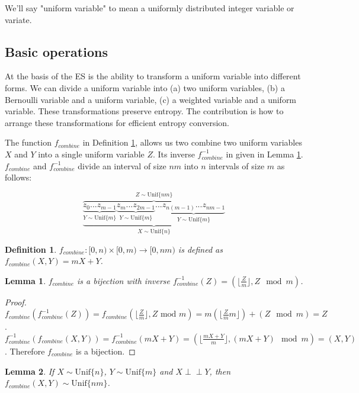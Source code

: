 \documentclass[12pt]{article}
\newtheorem{lemma}{Lemma}
\newtheorem{definition}{Definition}
\newcommand{\indep}{\perp\!\!\!\perp}
\newcommand{\unif}[1]{\mathrm{Unif}\{#1\}}
\begin{document}
We'll say "uniform variable" to mean a uniformly distributed integer variable or variate.


\subsection{Basic operations}

At the basis of the ES is the ability to transform a uniform variable into different forms.  We can divide a uniform variable into (a) two uniform variables, (b) a Bernoulli variable and a uniform variable, (c) a weighted variable and a uniform variable. These transformations preserve entropy. The contribution is how to arrange these transformations for efficient entropy conversion.

The function $f_{combine}$ in Definition \ref{def:combine}, allows us two combine two uniform variables $X$ and $Y$ into a single uniform variable $Z$. Its inverse $f^{-1}_{combine}$ in given in Lemma \ref{lem:divide}. $f_{combine}$ and $f^{-1}_{combine}$ divide an interval of size $nm$ into $n$ intervals of size $m$ as follows:

\[
\overbrace{    
    \underbrace{
        \underbrace{z_0 ... z_{m-1}}_{Y \sim \unif{m}}
        \underbrace{z_m ... z_{2m-1}}_{Y \sim \unif{m}}
        ...
        \underbrace{z_{n(m-1)}...z_{nm-1}}_{Y \sim \unif{m}}    
    }}_{X \sim \unif{n}}
^{Z \sim \unif{nm}}
\]

\begin{definition}
    $f_{combine}: [0,n)\times [0,m) \rightarrow [0,nm)$ is defined as $f_{combine}(X,Y) = mX+Y$.
    \label{def:combine}
\end{definition}

\begin{lemma}
    $f_{combine}$ is a bijection with inverse $f^{-1}_{combine}(Z) = (\lfloor \frac{Z}{m} \rfloor, Z \mod m)$.
    \label{lem:divide}
\end{lemma}

\begin{proof}
    $f_{combine}(f^{-1}_{combine}(Z)) = f_{combine}(\lfloor \frac{Z}{m}\rfloor, Z \text{ mod } m) = m(\lfloor \frac{Z}{m}m \rfloor) + (Z \mod m) = Z$. $f^{-1}_{combine}(f_{combine}(X,Y)) = f^{-1}_{combine}(mX+Y) = (\lfloor\frac{mX+Y}{m}\rfloor, (mX+Y)\mod m) = (X,Y)$. Therefore $f_{combine}$ is a bijection.
\end{proof}

\begin{lemma}
    If $X \sim \unif{n}$, $Y \sim \unif{m}$ and $X \indep Y$, then 
    $f_{combine}(X,Y) \sim \unif{nm}$.
    \label{lem:combine}
\end{lemma}
\end{document}
